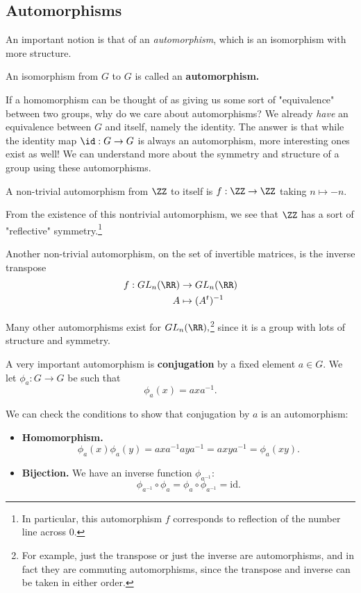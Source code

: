 \subsection{Automorphisms}

An important notion is that of an \emph{automorphism}, which is an isomorphism with more structure. 
\begin{definition}
An isomorphism from $G$ to $G$ is called an \textbf{automorphism.}
\end{definition}

If a homomorphism can be thought of as giving us some sort of "equivalence" between two groups, why do we care about automorphisms? We already \emph{have} an equivalence between $G$ and itself, namely the identity. The answer is that while the identity map $\id: G \rightarrow G$ is always an automorphism, more interesting ones exist as well! We can understand more about the symmetry and structure of a group using these automorphisms.

\begin{example}
A non-trivial automorphism from $\ZZ$ to itself is $f: \ZZ \rightarrow \ZZ$ taking $n \mapsto -n.$
\end{example}

From the existence of this nontrivial automorphism, we see that $\ZZ$ has a sort of "reflective" symmetry.\footnote{In particular, this automorphism $f$ corresponds to reflection of the number line across 0.}

\begin{example}
Another non-trivial automorphism, on the set of invertible matrices, is the inverse transpose 
\begin{align*}
    f: GL_n(\RR) &\rightarrow GL_n(\RR) \\
    A &\mapsto (A^t)^{-1}
\end{align*}
\end{example}

Many other automorphisms exist for $GL_n(\RR),$\footnote{For example, just the transpose or just the inverse are automorphisms, and in fact they are commuting automorphisms, since the transpose and inverse can be taken in either order.} since it is a group with lots of structure and symmetry. 

\begin{example}[Conjugation]
A very important automorphism is \textbf{conjugation} by a fixed element $a \in G.$ We let $\phi_a: G \rightarrow G$ be such that
\[
\phi_a(x) = axa^{-1}.
\]

We can check the conditions to show that conjugation by $a$ is an automorphism:
\begin{itemize}
    \item \textbf{Homomorphism.} \[
    \phi_a(x)\phi_a(y) = axa^{-1}aya^{-1} = axya^{-1} = \phi_a(xy).
    \]
    \item \textbf{Bijection.} We have an inverse function $\phi_{a^{-1}}$: 
    \[
    \phi_{a^{-1}} \circ \phi_{a} = \phi_{a} \circ \phi_{a^{-1}} = \text{id}.
    \]
\end{itemize}
\end{example} 

